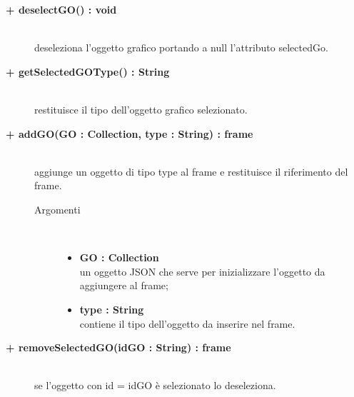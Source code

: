 \begin{description}
\begin{description}
\begin{description}
\begin{description}
\end{description}

\end{description}

\begin{description}
		\item[\textbf{\color{blue}+ deselectGO() : void			}] \hfill \\
			deseleziona l'oggetto grafico portando a null l'attributo selectedGo. 
\end{description}

\begin{description}
		\item[\textbf{\color{blue}+ getSelectedGOType() : String			}] \hfill \\
			restituisce il tipo dell'oggetto grafico selezionato.
\end{description}

\begin{description}
		\item[\textbf{\color{blue}+ addGO(GO : Collection, type : String) : frame			}] \hfill \\
			aggiunge un oggetto di tipo type al frame e restituisce il riferimento del frame.  

\begin{description}
			\item[Argomenti] \hfill \\
				\begin{itemize}
						\item \textbf{GO : Collection			} \hfill \\
					un oggetto JSON che serve per inizializzare l'oggetto da aggiungere al frame;
					  	\item \textbf{type : String			} \hfill \\
					  	contiene il tipo dell'oggetto da inserire nel frame.
				\end{itemize}

\end{description}

\end{description}

\begin{description}
		\item[\textbf{\color{blue}+ removeSelectedGO(idGO : String) : frame			}] \hfill \\
			se l'oggetto con id = idGO è selezionato lo deseleziona.  


\end{description}
\end{description}
\end{description}
